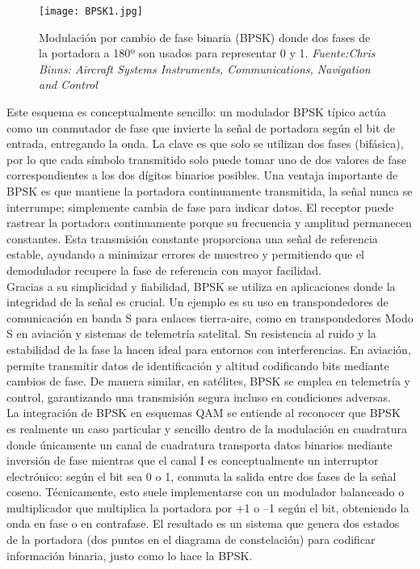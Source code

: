 \begin{figure}[H]
    \centering
    \texttt{[image: BPSK1.jpg]}
    \caption{\centering Modulación por cambio de fase binaria (BPSK) donde dos fases de la portadora a 180º son usados para representar 0 y 1.\textit{ Fuente:Chris Binns: Aircraft Systems Instruments, Communications, Navigation and Control}}
    \label{fig:bpsk1}
\end{figure}

 Este esquema es conceptualmente sencillo: un modulador BPSK típico actúa como un conmutador de fase que invierte la señal de portadora según el bit de entrada, entregando la onda. La clave es que solo se utilizan dos fases (bifásica), por lo que cada símbolo transmitido solo puede tomar uno de dos valores de fase correspondientes a los dos dígitos binarios posibles. Una ventaja importante de BPSK es que mantiene la portadora continuamente transmitida, la señal nunca se interrumpe; simplemente cambia de fase para indicar datos.  El receptor puede rastrear la portadora continuamente porque su frecuencia y amplitud permanecen constantes. Esta transmisión constante proporciona una señal de referencia estable, ayudando a minimizar errores de muestreo y permitiendo que el demodulador recupere la fase de referencia con mayor facilidad.\\
 
 Gracias a su simplicidad y fiabilidad, BPSK se utiliza en aplicaciones donde la integridad de la señal es crucial. Un ejemplo es su uso en transpondedores de comunicación en banda S para enlaces tierra-aire, como en transpondedores Modo S en aviación y sistemas de telemetría satelital. Su resistencia al ruido y la estabilidad de la fase la hacen ideal para entornos con interferencias. En aviación, permite transmitir datos de identificación y altitud codificando bits mediante cambios de fase. De manera similar, en satélites, BPSK se emplea en telemetría y control, garantizando una transmisión segura incluso en condiciones adversas.\\
 
La integración de BPSK en esquemas QAM se entiende al reconocer que BPSK es realmente un caso particular y sencillo dentro de la modulación en cuadratura donde únicamente un canal de cuadratura transporta datos binarios mediante inversión de fase mientras que el canal I es conceptualmente un interruptor electrónico: según el bit sea 0 o 1, conmuta la salida entre dos fases de la señal coseno. Técnicamente, esto suele implementarse con un modulador balanceado o multiplicador que multiplica la portadora por +1 o –1 según el bit, obteniendo la onda en fase o en contrafase. El resultado es un sistema que genera dos estados de la portadora (dos puntos en el diagrama de constelación) para codificar información binaria, justo como lo hace la BPSK. 


